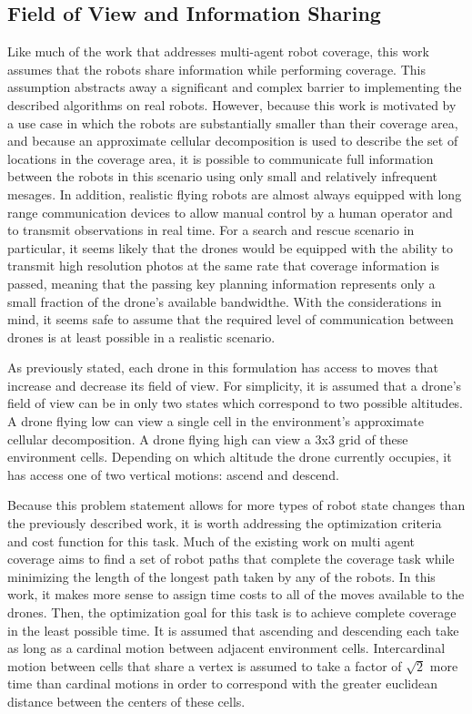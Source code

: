 \subsection{Field of View and Information Sharing}

Like much of the work that addresses multi-agent robot coverage, this work assumes that the robots share information while performing coverage. This assumption abstracts away a significant and complex barrier to implementing the described algorithms on real robots. However, because this work is motivated by a use case in which the robots are substantially smaller than their coverage area, and because an approximate cellular decomposition is used to describe the set of locations in the coverage area, it is possible to communicate full information between the robots in this scenario using only small and relatively infrequent mesages. In addition, realistic flying robots are almost always equipped with long range communication devices to allow manual control by a human operator and to transmit observations in real time. For a search and rescue scenario in particular, it seems likely that the drones would be equipped with the ability to transmit high resolution photos at the same rate that coverage information is passed, meaning that the passing key planning information represents only a small fraction of the drone's available bandwidthe. With the considerations in mind, it seems safe to assume that the required level of communication between drones is at least possible in a realistic scenario. 

As previously stated, each drone in this formulation has access to moves that increase and decrease its field of view. For simplicity, it is assumed that a drone's field of view can be in only two states which correspond to two possible altitudes. A drone flying low can view a single cell in the environment's approximate cellular decomposition. A drone flying high can view a 3x3 grid of these environment cells. Depending on which altitude the drone currently occupies, it has access one of two vertical motions: ascend and descend.

Because this problem statement allows for more types of robot state changes than the previously described work, it is worth addressing the optimization criteria and cost function for this task. Much of the existing work on multi agent coverage aims to find a set of robot paths that complete the coverage task while minimizing the length of the longest path taken by any of the robots. In this work, it makes more sense to assign time costs to all of the moves available to the drones. Then, the optimization goal for this task is to achieve complete coverage in the least possible time. It is assumed that ascending and descending each take as long as a cardinal motion between adjacent environment cells. Intercardinal motion between cells that share a vertex is assumed to take a factor of $ \sqrt{2} $ more time than cardinal motions in order to correspond with the greater euclidean distance between the centers of these cells.
